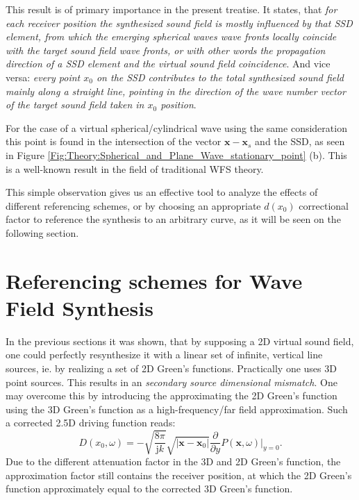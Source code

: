 \documentclass[12pt,a4paper]{article}
\newcommand{\ti}{\mathrm{j}}
\newcommand{\vx}{\mathbf{x}}
\newcommand{\vxo}{\mathbf{x}_0}
\begin{document}
\vspace{3mm}
This result is of primary importance in the present treatise. It states, that \emph{for each receiver position the synthesized sound field is mostly influenced by that SSD element, from which the emerging spherical waves wave fronts locally coincide with the target sound field wave fronts, or with other words the propagation direction of a SSD element and the virtual sound field coincidence}. And vice versa: \emph{every point $x_0$ on the SSD contributes to the total synthesized sound field mainly along a straight line, pointing in the direction of the wave number vector of the target sound field taken in $x_0$ position}. 

For the case of a virtual spherical/cylindrical wave using the same consideration this point is found in the intersection of the vector $ \vx - \mathbf{x}_s $ and the SSD, as seen in Figure \ref{Fig:Theory:Spherical_and_Plane_Wave_stationary_point} (b). This is a well-known result in the field of traditional WFS theory.

This simple observation gives us an effective tool to analyze the effects of different referencing schemes, or by choosing an appropriate $d(x_0)$ correctional factor to reference the synthesis to an arbitrary curve, as it will be seen on the following section.

\section{Referencing schemes for Wave Field Synthesis}

In the previous sections it was shown, that by supposing a 2D virtual sound field, one could perfectly resynthesize it with a linear set of infinite, vertical line sources, ie. by realizing a set of 2D Green's functions. Practically one uses 3D point sources. This results in an \emph{secondary source dimensional mismatch}. One may overcome this by introducing the approximating the 2D Green's function using the 3D Green's function as a high-frequency/far field approximation. Such a corrected 2.5D driving function reads:
\begin{equation}
D(x_0,\omega) = 
- \sqrt{\frac{8\pi}{\ti k}} \sqrt{|\vx-\vxo|} \frac{\partial}{\partial y} \left. P(\vx,\omega) \right|_{y = 0}.
\label{Eq:Gen_rayleigh_x_x0}
\end{equation}
Due to the different attenuation factor in the 3D and 2D Green's function, the approximation factor still contains the receiver position, at which the 2D Green's function approximately equal to the corrected 3D Green's function. 
\end{document}
